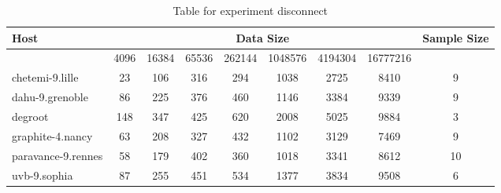 \begin{table}
\caption{Table for experiment disconnect}
\begin{tabular}{@{}lcccccccc@{}}
\toprule
Host    & \multicolumn{7}{c}{Data Size}          & Sample Size \\ \midrule
& 4096  & 16384  & 65536  & 262144  & 1048576  & 4194304  & 16777216              \\ \midrule
chetemi-9.lille  & 23  & 106  & 316  & 294  & 1038  & 2725  & 8410  & 9 \\
dahu-9.grenoble  & 86  & 225  & 376  & 460  & 1146  & 3384  & 9339  & 9 \\
degroot  & 148  & 347  & 425  & 620  & 2008  & 5025  & 9884  & 3 \\
graphite-4.nancy  & 63  & 208  & 327  & 432  & 1102  & 3129  & 7469  & 9 \\
paravance-9.rennes  & 58  & 179  & 402  & 360  & 1018  & 3341  & 8612  & 10 \\
uvb-9.sophia  & 87  & 255  & 451  & 534  & 1377  & 3834  & 9508  & 6 \\
\bottomrule
\end{tabular}
\end{table}